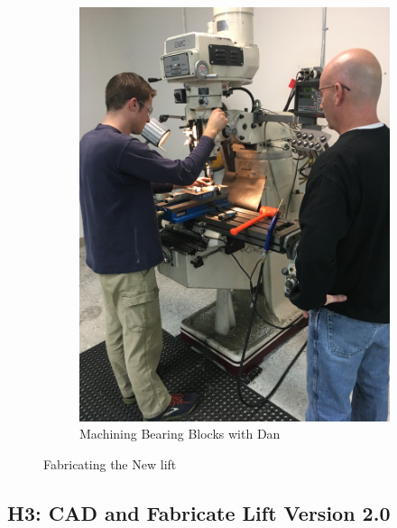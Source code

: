\documentclass{article}
\begin{document}
\begin{figure}[h!]
\begin{subfigure}{.45\textwidth}
  \includegraphics[width=\textwidth,angle=-90]{25_02-18/images/Make.jpg}
    \caption{Machining Bearing Blocks with Dan}
    \label{fig:Machining}
  \end{subfigure}
  \caption{Fabricating the New lift}
   \end{figure}
   
\subsection{H3: CAD and Fabricate Lift Version 2.0}
\end{document}
